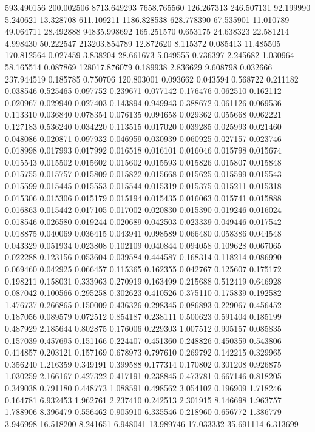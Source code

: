 593.490156
200.002506
8713.649293
7658.765560
126.267313
246.507131
92.199990
5.240621
13.328708
611.109211
1186.828538
628.778390
67.535901
11.010789
49.064711
28.492888
94835.998692
165.251570
0.653175
24.638323
22.581214
4.998430
50.222547
213203.854789
12.872620
8.115372
0.085413
11.485505
170.812564
0.027459
3.838204
28.661673
5.049555
0.736397
2.245682
1.030964
58.165514
0.087869
128017.876079
0.189938
2.836629
9.608798
0.032666
237.944519
0.185785
0.750706
120.803001
0.093662
0.043594
0.568722
0.211182
0.038546
0.525465
0.097752
0.239671
0.077142
0.176476
0.062510
0.162112
0.020967
0.029940
0.027403
0.143894
0.949943
0.388672
0.061126
0.069536
0.113310
0.036840
0.078354
0.076135
0.094658
0.029362
0.055668
0.062221
0.127183
0.536240
0.034220
0.113515
0.017020
0.039285
0.025993
0.021460
0.048086
0.020871
0.097932
0.046959
0.030939
0.060925
0.027157
0.023746
0.018998
0.017993
0.017992
0.016518
0.016101
0.016046
0.015798
0.015674
0.015543
0.015502
0.015602
0.015602
0.015593
0.015826
0.015807
0.015848
0.015755
0.015757
0.015809
0.015822
0.015668
0.015625
0.015599
0.015543
0.015599
0.015445
0.015553
0.015544
0.015319
0.015375
0.015211
0.015318
0.015306
0.015306
0.015179
0.015194
0.015435
0.016063
0.015741
0.015888
0.016863
0.015442
0.017105
0.017002
0.020830
0.015390
0.019246
0.016024
0.018546
0.026580
0.019244
0.020689
0.042503
0.023339
0.049446
0.017542
0.018875
0.040069
0.036415
0.043941
0.098589
0.066480
0.058386
0.044548
0.043329
0.051934
0.023808
0.102109
0.040844
0.094058
0.109628
0.067065
0.022288
0.123156
0.053604
0.039584
0.444587
0.168314
0.118214
0.086990
0.069460
0.042925
0.066457
0.115365
0.162355
0.042767
0.125607
0.175172
0.198211
0.158031
0.333963
0.270919
0.163499
0.215688
0.512419
0.646928
0.087042
0.100566
0.295258
0.302623
0.410526
0.375110
0.175839
0.192582
1.476737
0.266865
0.150009
0.436326
0.298345
0.086893
0.229067
0.456452
0.187056
0.089579
0.072512
0.854187
0.238111
0.500623
0.591404
0.185199
0.487929
2.185644
0.802875
0.176006
0.229303
1.007512
0.905157
0.085835
0.157039
0.457695
0.151166
0.224407
0.451360
0.248826
0.450359
0.543806
0.414857
0.203121
0.157169
0.678973
0.797610
0.269792
0.142215
0.329965
0.356240
1.216359
0.349191
0.399588
0.177314
0.170802
0.301208
0.926875
1.030259
2.166167
0.427322
0.417191
0.238845
0.473781
0.667146
0.818205
0.349038
0.791180
0.448773
1.088591
0.498562
3.054102
0.196909
1.718246
0.164781
6.932453
1.962761
2.237410
0.242513
2.301915
8.146698
1.963757
1.788906
8.396479
0.556462
0.905910
6.335546
0.218960
0.656772
1.386779
3.946998
16.518200
8.241651
6.948041
13.989746
17.033332
35.691114
6.313699
